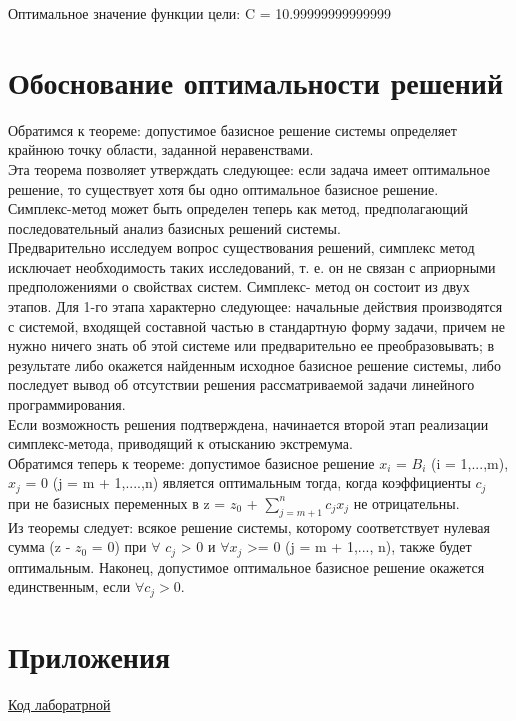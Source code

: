 \documentclass[a4]{article}
\begin{document}
					Оптимальное значение функции цели: C = 10.99999999999999
	\section{Обоснование оптимальности решений}
		Обратимся к теореме: допустимое базисное решение системы определяет крайнюю точку области, заданной неравенствами.\\
		Эта теорема позволяет утверждать следующее: если задача имеет оптимальное решение, то существует хотя бы одно оптимальное базисное решение.\\ Симплекс-метод может быть определен теперь как метод, предполагающий последовательный анализ базисных решений системы.\\
		Предварительно исследуем вопрос существования решений, симплекс метод исключает необходимость таких исследований, т. е. он не связан с априорными предположениями о свойствах систем. Симплекс- метод он состоит из двух этапов. Для 1-го этапа характерно следующее: начальные действия производятся с системой, входящей составной частью в стандартную форму задачи, причем не нужно ничего знать об этой системе или предварительно ее преобразовывать; в результате либо окажется найденным исходное базисное решение системы, либо последует вывод об отсутствии решения рассматриваемой задачи линейного программирования.\\
		Если возможность решения подтверждена, начинается второй этап реализации симплекс-метода, приводящий к отысканию экстремума.\\
		Обратимся теперь к теореме: допустимое базисное решение $x_i$ = $B_i$ (i = 1,...,m), $x_j$ = 0 (j = m + 1,....,n) является оптимальным тогда, когда коэффициенты $c_j$ при не базисных переменных в z = $z_0$ + $\sum_{j = m+ 1}^{n} c_jx_j$ не отрицательны.\\
		Из теоремы следует: всякое решение системы, которому соответствует нулевая сумма (z - $z_0$ = 0) при $\forall$ $c_j$ > 0 и $\forall$$x_j$ >= 0 (j = m + 1,..., n), также будет оптимальным. Наконец, допустимое оптимальное базисное решение окажется единственным, если $\forall c_j > 0$.
	\section{Приложения}
		\href{https://github.com/LuciusGen/MetOpt/tree/master/venv}{Код лаборатрной}
	
\end{document}
